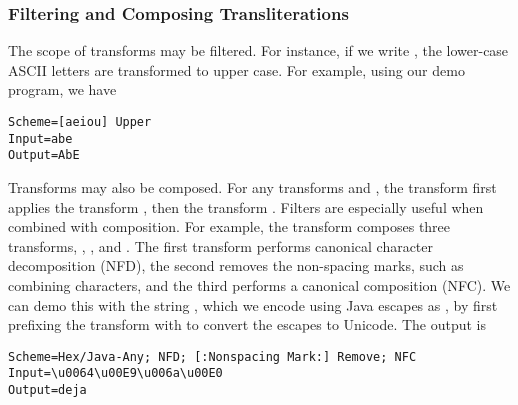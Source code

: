 \subsubsection{Filtering and Composing Transliterations}

The scope of transforms may be filtered. For instance, if we write
, the lower-case ASCII letters are transformed
to upper case.  For example,
using our demo program, we have
%
\begin{verbatim}
Scheme=[aeiou] Upper
Input=abe
Output=AbE
\end{verbatim}
%

Transforms may also be composed.  For any transforms  
and , the transform  first applies the transform
, then the transform .  
Filters are especially useful when combined with composition.  For
example, the transform
composes three transforms, , , and .  The first transform performs canonical
character decomposition (NFD), the second removes the non-spacing
marks, such as combining characters, and the third performs a
canonical composition (NFC).  We can demo this with the string
, which we encode using Java escapes as
, by first prefixing
the transform with \code{Hex/Java-Any} to convert the escapes to Unicode.
The output is
%
\begin{verbatim}
Scheme=Hex/Java-Any; NFD; [:Nonspacing Mark:] Remove; NFC
Input=\u0064\u00E9\u006a\u00E0
Output=deja
\end{verbatim}



